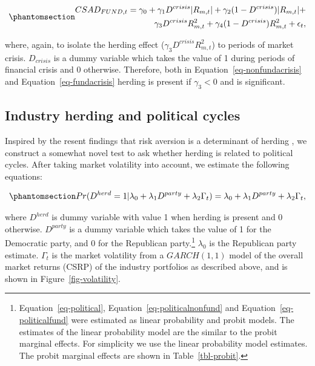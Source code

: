 \documentclass[
  letterpaper,
  DIV=11,
  numbers=noendperiod]{scrartcl}
\begin{document}
\begin{equation}\phantomsection\label{eq-fundacrisis}{
\begin{aligned}
CSAD_{FUND, t} = \gamma_0 +  \gamma_1D^{crisis}|R_{m, t}| + \gamma_2(1 - D^{crisis})|R_{m,t}|  + \\ \gamma_3D^{crisis}R_{m, t}^2 + \gamma_4(1-D^{crisis})R_{m,t}^2 + \epsilon_{t},
\end{aligned}
}\end{equation}

where, again, to isolate the herding effect
(\(\gamma_3D^{crisis}R_{m, t}^2\)) to periods of market crisis.
\(D_{crisis}\) is a dummy variable which takes the value of 1 during
periods of financial crisis and 0 otherwise. Therefore, both in
Equation~\ref{eq-nonfundacrisis} and Equation~\ref{eq-fundacrisis}
herding is present if \(\gamma_3 < 0\) and is significant.

\subsection{Industry herding and political
cycles}\label{industry-herding-and-political-cycles}

Inspired by the resent findings that risk aversion is a determinant of
herding \citep{nath2020investor}, we construct a somewhat novel test to
ask whether herding is related to political cycles. After taking market
volatility into account, we estimate the following equations:

\begin{equation}\phantomsection\label{eq-political}{
Pr(D^{herd} = 1 |\lambda_0 +  \lambda_1D^{party}  + \lambda_2\Gamma_t) = \lambda_0 +  \lambda_1D^{party}  + \lambda_2\Gamma_t,
}\end{equation}

where \(D^{herd}\) is dummy variable with value 1 when herding is
present and 0 otherwise. \(D^{party}\) is a dummy variable which takes
the value of 1 for the Democratic party, and 0 for the Republican
party.\footnote{Equation~\ref{eq-political},
  Equation~\ref{eq-politicalnonfund} and Equation~\ref{eq-politicalfund}
  were estimated as linear probability and probit models. The estimates
  of the linear probability model are the similar to the probit marginal
  effects. For simplicity we use the linear probability model estimates.
  The probit marginal effects are shown in Table~\ref{tbl-probit}.}
\(\lambda_0\) is the Republican party estimate. \(\Gamma_t\) is the
market volatility from a \(GARCH(1,1)\) model of the overall market
returns (CSRP) of the industry portfolios as described above, and is
shown in Figure~\ref{fig-volatility}.
\end{document}
